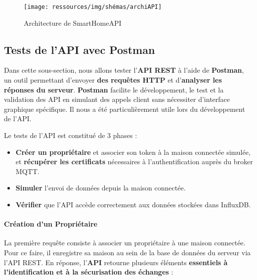 \documentclass[10pt, a4paper]{report}
\begin{document}
	\begin{figure}[h!]
		\centering
		\texttt{[image: ressources/img/shémas/archiAPI]}
		\caption{Architecture de SmartHomeAPI}
		\label{fig:archAPI}
	\end{figure}
	
	
	\subsection{Tests de l'API avec Postman}
	
	Dans cette sous-section, nous allons tester l’\textbf{API REST} à l’aide de \textbf{Postman}, un outil permettant d’envoyer \textbf{des requêtes HTTP} et d’\textbf{analyser les réponses du serveur}. \textbf{Postman} facilite le développement, le test et la validation des API en simulant des appels client sans nécessiter d’interface graphique spécifique. Il nous a été particulièrement utile lors du développement de l'API.
	
	Le tests de l'API est constitué de 3 phases :
	\begin{itemize}
		\item \textbf{Créer un propriétaire} et associer son token à la maison connectée simulée, et \textbf{récupérer les certificats} nécessaires à l’authentification auprès du broker MQTT.
		\item \textbf{Simuler} l’envoi de données depuis la maison connectée.
		\item \textbf{Vérifier} que l’API accède correctement aux données stockées dans InfluxDB.
	\end{itemize}
	
	

	
	\paragraph{Création d'un Propriétaire} La première requête consiste à associer un propriétaire à une maison connectée. Pour ce faire, il enregistre sa maison au sein de la base de données du serveur via l’API REST. En réponse, l’\textbf{API} retourne plusieurs éléments \textbf{essentiels à l’identification et à la sécurisation des échanges} :
	
\end{document}
